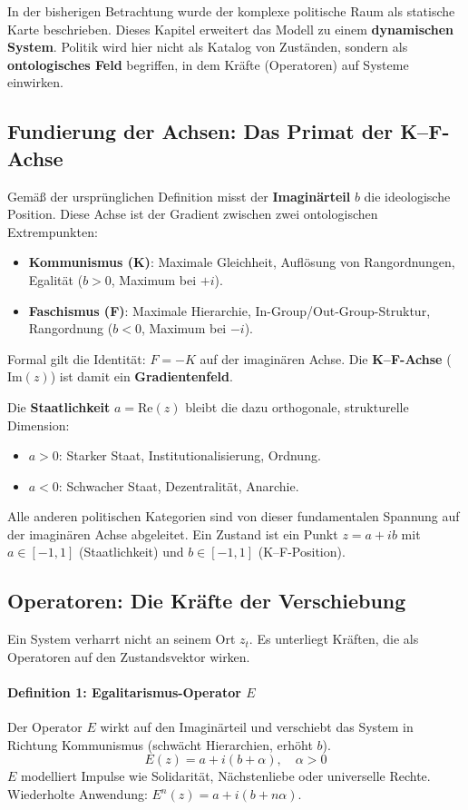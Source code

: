 \documentclass[12pt, a4paper]{article}
\begin{document}
In der bisherigen Betrachtung wurde der komplexe politische Raum als statische Karte beschrieben. Dieses Kapitel erweitert das Modell zu einem \textbf{dynamischen System}. Politik wird hier nicht als Katalog von Zuständen, sondern als \textbf{ontologisches Feld} begriffen, in dem Kräfte (Operatoren) auf Systeme einwirken.

\subsection{Fundierung der Achsen: Das Primat der K--F-Achse}

Gemäß der ursprünglichen Definition misst der \textbf{Imaginärteil} \(b\) die ideologische Position. Diese Achse ist der Gradient zwischen zwei ontologischen Extrempunkten:
\begin{itemize}
    \item \textbf{Kommunismus (K)}: Maximale Gleichheit, Auflösung von Rangordnungen, Egalität (\(b > 0\), Maximum bei \(+i\)).
    \item \textbf{Faschismus (F)}: Maximale Hierarchie, In-Group/Out-Group-Struktur, Rangordnung (\(b < 0\), Maximum bei \(-i\)).
\end{itemize}
Formal gilt die Identität: \(F = -K\) auf der imaginären Achse. Die \textbf{K--F-Achse} (\(\text{Im}(z)\)) ist damit ein \textbf{Gradientenfeld}. 

Die \textbf{Staatlichkeit} \(a = \text{Re}(z)\) bleibt die dazu orthogonale, strukturelle Dimension:
\begin{itemize}
    \item \(a > 0\): Starker Staat, Institutionalisierung, Ordnung.
    \item \(a < 0\): Schwacher Staat, Dezentralität, Anarchie.
\end{itemize}

Alle anderen politischen Kategorien sind von dieser fundamentalen Spannung auf der imaginären Achse abgeleitet. Ein Zustand ist ein Punkt \(z = a + ib\) mit \(a \in [-1, 1]\) (Staatlichkeit) und \(b \in [-1, 1]\) (K--F-Position).

\subsection{Operatoren: Die Kräfte der Verschiebung}

Ein System verharrt nicht an seinem Ort \(z_t\). Es unterliegt Kräften, die als Operatoren auf den Zustandsvektor wirken.

\paragraph{Definition 1: Egalitarismus-Operator \(E\)}
Der Operator \(E\) wirkt auf den Imaginärteil und verschiebt das System in Richtung Kommunismus (schwächt Hierarchien, erhöht \(b\)).
\[
E(z) = a + i(b + \alpha), \quad \alpha > 0
\]
\(E\) modelliert Impulse wie Solidarität, Nächstenliebe oder universelle Rechte. Wiederholte Anwendung: \(E^n(z) = a + i(b + n\alpha)\).
\end{document}
